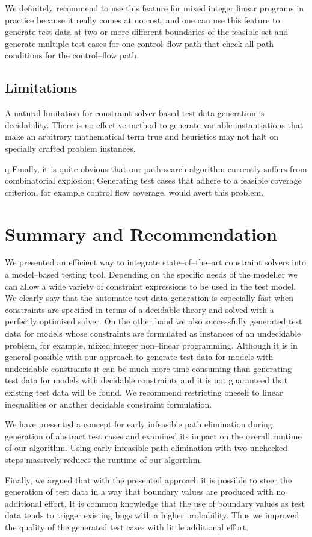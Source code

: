 \documentclass[runningheads,a4paper]{llncs}%
\begin{document}
We definitely recommend to use this feature for mixed integer linear programs in
practice because it really comes at no cost, and one can use this feature to
generate test data at two or more different boundaries of the feasible set and
generate multiple test cases for one control--flow path that check all path
conditions for the control--flow path.
\subsection{Limitations}
A natural limitation for constraint solver based test data generation is
decidability. There is no effective method to generate variable instantiations
that make an arbitrary mathematical term true and heuristics may not halt on
specially crafted problem instances.

q
Finally, it is quite obvious that our path search algorithm currently suffers
from combinatorial explosion; Generating test cases that adhere to a feasible
coverage criterion, for example control flow coverage, would avert this problem.
\section{Summary and Recommendation}%
\label{sec:Recommendation}%
We presented an efficient way to integrate state--of--the--art constraint
solvers into a model--based testing tool. Depending on the specific needs of the
modeller we can allow a wide variety of constraint expressions to be used in the
test model. We clearly saw that the automatic test data generation is especially
fast when constraints are specified in terms of a decidable theory and solved
with a perfectly optimised solver. On the other hand we also successfully
generated test data for models whose constraints are formulated as instances of
an undecidable problem, for example, mixed integer non--linear programming.
Although it is in general possible with our approach to generate test data for
models with undecidable constraints it can be much more time consuming than
generating test data for models with decidable constraints and it is not
guaranteed that existing test data will be found. We recommend restricting
oneself to linear inequalities or another decidable constraint formulation.

We have presented a concept for early infeasible path elimination during
generation of abstract test cases and examined its impact on the overall runtime
of our algorithm. Using early infeasible path elimination with two unchecked
steps massively reduces the runtime of our algorithm.

Finally, we argued that with the presented approach it is possible to steer the
generation of test data in a way that boundary values are produced with no
additional effort. It is common knowledge that the use of boundary values as
test data tends to trigger existing bugs with a higher probability. Thus we
improved the quality of the generated test cases with little additional effort.%
%
%
\end{document}
